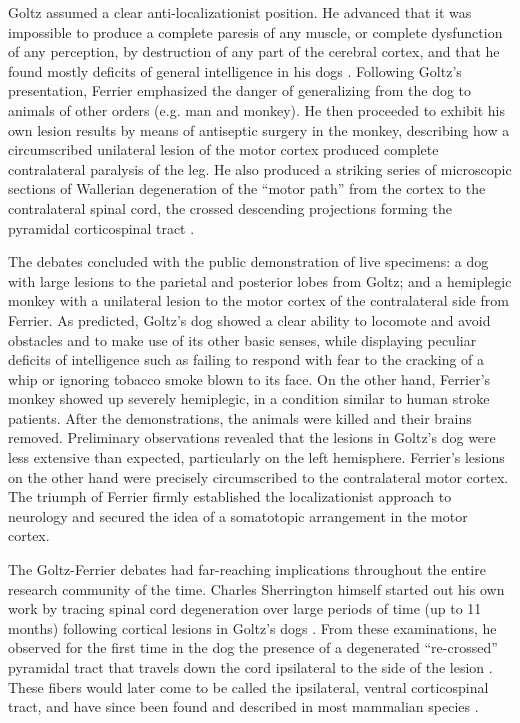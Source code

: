 Goltz assumed a clear anti-localizationist position. He advanced that it was impossible to produce a complete paresis of any muscle, or complete dysfunction of any perception, by destruction of any part of the cerebral cortex, and that he found mostly deficits of general intelligence in his dogs \cite{Tyler2000}. Following Goltz's presentation, Ferrier emphasized the danger of generalizing from the dog to animals of other orders (e.g. man and monkey). He then proceeded to exhibit his own lesion results by means of antiseptic surgery in the monkey, describing how a circumscribed unilateral lesion of the motor cortex produced complete contralateral paralysis of the leg. He also produced a striking series of microscopic sections of Wallerian degeneration \cite{Waller1850} of the ``motor path'' from the cortex to the contralateral spinal cord, the crossed descending projections forming the pyramidal corticospinal tract \cite{Tyler2000}.

The debates concluded with the public demonstration of live specimens: a dog with large lesions to the parietal and posterior lobes from Goltz; and a hemiplegic monkey with a unilateral lesion to the motor cortex of the contralateral side from Ferrier. As predicted, Goltz's dog showed a clear ability to locomote and avoid obstacles and to make use of its other basic senses, while displaying peculiar deficits of intelligence such as failing to respond with fear to the cracking of a whip or ignoring tobacco smoke blown to its face. On the other hand, Ferrier's monkey showed up severely hemiplegic, in a condition similar to human stroke patients. After the demonstrations, the animals were killed and their brains removed. Preliminary observations revealed that the lesions in Goltz's dog were less extensive than expected, particularly on the left hemisphere. Ferrier's lesions on the other hand were precisely circumscribed to the contralateral motor cortex. The triumph of Ferrier firmly established the localizationist approach to neurology and secured the idea of a somatotopic arrangement in the motor cortex.

The Goltz-Ferrier debates had far-reaching implications throughout the entire research community of the time. Charles Sherrington himself started out his own work by tracing spinal cord degeneration over large periods of time (up to 11 months) following cortical lesions in Goltz's dogs \cite{Langley1884,Sherrington1885}. From these examinations, he observed for the first time in the dog the presence of a degenerated ``re-crossed'' pyramidal tract that travels down the cord ipsilateral to the side of the lesion \cite{Sherrington1885}. These fibers would later come to be called the ipsilateral, ventral corticospinal tract, and have since been found and described in most mammalian species \cite{Kuypers1981,Brosamle2000,Lacroix2004}.

